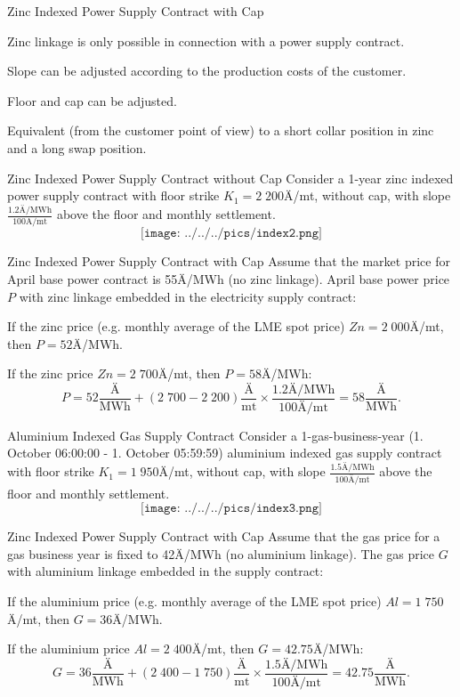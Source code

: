 {Zinc Indexed Power Supply Contract with Cap}
  \item<1-> Zinc linkage is only possible in connection with a power supply contract.
  \item<2-> Slope can be adjusted according to the production costs of the customer.
  \item<3-> Floor and cap can be adjusted.
  \item<4-> Equivalent (from the customer point of view) to a short collar position in zinc and a long swap position.

{Zinc Indexed Power Supply Contract without Cap}
Consider a 1-year zinc indexed power supply contract with floor strike $K_1=2\;200$Ä/mt, without cap, with slope $\frac{1.2\text{Ä/MWh}}{100\text{Ä/mt}}$ above the floor and monthly settlement.
$$\texttt{[image: ../../../pics/index2.png]}$$

{Zinc Indexed Power Supply Contract with Cap}
Assume that the market price for April base power contract is \textcolor[rgb]{1.00,0.00,0.00}{55Ä/MWh} (no zinc linkage). April base power price $P$ with zinc linkage embedded in the electricity supply contract:
\vspace{0.4cm}
  \item<2-> If the zinc price (e.g. monthly average of the LME spot price) $Zn=2\;000$Ä/mt, then \textcolor[rgb]{0.00,0.00,1.00}{$P=52$Ä/MWh}.
  \item<3-> If the zinc price $Zn=2\;700$Ä/mt, then \textcolor[rgb]{0.00,0.00,1.00}{$P=58$Ä/MWh}:
  $$P=52\frac{\text{Ä}}{\text{MWh}}+(2\;700-2\;200)\frac{\text{Ä}}{\text{mt}}\times\frac{1.2\text{Ä/MWh}}{100\text{Ä/mt}}=58\frac{\text{Ä}}{\text{MWh}}.$$

{Aluminium Indexed Gas Supply Contract}
Consider a 1-gas-business-year (1. October 06:00:00 - 1. October 05:59:59) aluminium indexed gas supply contract with floor strike $K_1=1\;950$Ä/mt, without cap, with slope $\frac{1.5\text{Ä/MWh}}{100\text{Ä/mt}}$ above the floor and monthly settlement.
$$\texttt{[image: ../../../pics/index3.png]}$$

{Zinc Indexed Power Supply Contract with Cap}
Assume that the gas price for a gas business year is fixed to \textcolor[rgb]{1.00,0.00,0.00}{42Ä/MWh} (no aluminium linkage). The gas price $G$ with aluminium linkage embedded in the supply contract:
\vspace{0.4cm}
  \item<2-> If the aluminium price (e.g. monthly average of the LME spot price) $Al=1\;750$Ä/mt, then \textcolor[rgb]{0.00,0.00,1.00}{$G=36$Ä/MWh}.
  \item<3-> If the aluminium price $Al=2\;400$Ä/mt, then \textcolor[rgb]{0.00,0.00,1.00}{$G=42.75$Ä/MWh}:
  $$G=36\frac{\text{Ä}}{\text{MWh}}+(2\;400-1\;750)\frac{\text{Ä}}{\text{mt}}\times\frac{1.5\text{Ä/MWh}}{100\text{Ä/mt}}=42.75\frac{\text{Ä}}{\text{MWh}}.$$

